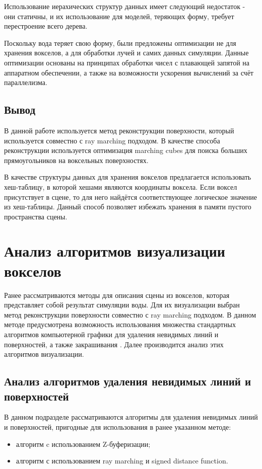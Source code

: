 Использование иерахических структур данных имеет следующий недостаток - они статичны, и их
использование для моделей, теряющих форму, требует перестроение всего дерева\cite{article:asvo}.

Поскольку вода теряет свою форму, были предложены оптимизации не для хранения вокселов, а для
обработки лучей и самих данных симуляции. Данные оптимизации основаны на принципах обработки
чисел с плавающей запятой на аппаратном обеспечении, а также на возможности ускорения
вычислений за счёт параллелизма\cite{book:ash}.

\subsection{Вывод}

В данной работе используется метод реконструкции поверхности, который используется
совместно с ray marching подходом. В качестве способа реконструкции используется оптимизация
marching cubes для поиска больших прямоугольников на воксельных поверхностях.

В качестве структуры данных для хранения вокселов предлагается использовать хеш-таблицу, в которой хешами являются
координаты воксела. Если воксел присутствует в сцене, то для него найдётся соответствующее логическое значение из
 хеш-таблицы. Данный способ позволяет избежать хранения в памяти пустого пространства сцены.


\section{Анализ алгоритмов визуализации вокселов}

Ранее рассматриваются методы для описания сцены из вокселов, которая представляет собой
результат симуляции воды. Для их визуализации выбран метод реконструкции поверхности
совместно с ray marching подходом. В данном методе предусмотрена возможность использования множества стандартных
алгоритмов компьютерной графики для удаления невидимых линий и поверхностей, а также закрашивания \cite{book:ash}. Далее производится анализ этих алгоритмов визуализации.

\subsection{Анализ алгоритмов удаления невидимых линий и поверхностей}

В данном подразделе рассматриваются алгоритмы для удаления невидимых линий и поверхностей, пригодные
для использования в ранее указанном методе:
\begin{itemize}
    \item алгоритм c использованием Z-буферизации;
    \item алгоритм с использованием ray marching и signed distance function.
\end{itemize}

